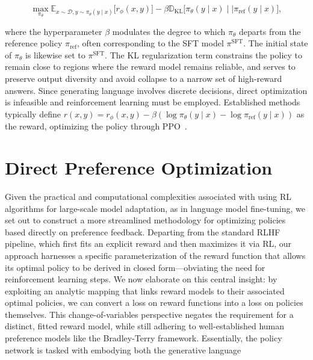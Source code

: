 \begin{equation}\label{eq:RL}
\max_{\pi_{\theta}}  \mathbb{E}_{x\sim \mathcal{D}, y\sim \pi_{\theta}(y \mid x)}\bigl[r_{\phi}(x, y)\bigr] - \beta\mathbb{D}_{\textrm{KL}}\bigl[\pi_{\theta}(y\mid x)\mid \mid \pi_\text{ref}(y\mid x)\bigr],
\end{equation}

where the hyperparameter $\beta$ modulates the degree to which $\pi_{\theta}$ departs from the reference policy $\pi_\text{ref}$, often corresponding to the SFT model $\pi^\text{SFT}$. The initial state of $\pi_\theta$ is likewise set to $\pi^\text{SFT}$. The KL regularization term constrains the policy to remain close to regions where the reward model remains reliable, and serves to preserve output diversity and avoid collapse to a narrow set of high-reward answers. Since generating language involves discrete decisions, direct optimization is infeasible and reinforcement learning must be employed. Established methods~\citep{ziegler2020finetuning, stiennon2022learning, bai2022training, ouyang2022training} typically define ${r(x, y) = r_{\phi}(x, y) -\beta (\log \pi_{\theta}(y\mid x) - \log \pi_\text{ref}(y\mid x))}$ as the reward, optimizing the policy through PPO~\cite{schulman2017proximal}.

\section{Direct Preference Optimization}\label{sec:DPO}

Given the practical and computational complexities associated with using RL algorithms for large-scale model adaptation, as in language model fine-tuning, we set out to construct a more streamlined methodology for optimizing policies based directly on preference feedback. Departing from the standard RLHF pipeline, which first fits an explicit reward and then maximizes it via RL, our approach harnesses a specific parameterization of the reward function that allows its optimal policy to be derived in closed form—obviating the need for reinforcement learning steps. We now elaborate on this central insight: by exploiting an analytic mapping that links reward models to their associated optimal policies, we can convert a loss on reward functions into a loss on policies themselves. This change-of-variables perspective negates the requirement for a distinct, fitted reward model, while still adhering to well-established human preference models like the Bradley-Terry framework. Essentially, the policy network is tasked with embodying both the generative language

